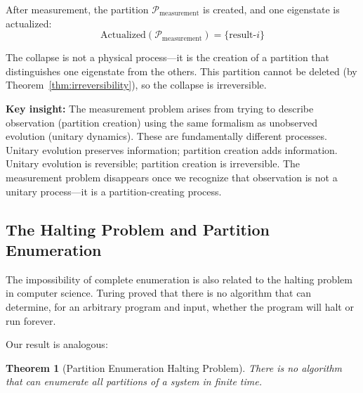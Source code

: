 \documentclass[twocolumn,10pt]{article}
\newtheorem{theorem}{Theorem}[section]
\theoremstyle{definition}
\theoremstyle{remark}
\begin{document}
After measurement, the partition $\mathcal{P}_{\text{measurement}}$ is created, and one eigenstate is actualized:
\begin{equation}
\text{Actualized}(\mathcal{P}_{\text{measurement}}) = \{\text{result-}i\}
\end{equation}

The collapse is not a physical process—it is the creation of a partition that distinguishes one eigenstate from the others. This partition cannot be deleted (by Theorem~\ref{thm:irreversibility}), so the collapse is irreversible.

\vspace{0.2cm}
\noindent\textbf{Key insight:} The measurement problem arises from trying to describe observation (partition creation) using the same formalism as unobserved evolution (unitary dynamics). These are fundamentally different processes. Unitary evolution preserves information; partition creation adds information. Unitary evolution is reversible; partition creation is irreversible. The measurement problem disappears once we recognize that observation is not a unitary process—it is a partition-creating process.

\subsection{The Halting Problem and Partition Enumeration}

The impossibility of complete enumeration is also related to the halting problem in computer science\cite{turing1936}. Turing proved that there is no algorithm that can determine, for an arbitrary program and input, whether the program will halt or run forever.

\vspace{0.2cm}
\noindent Our result is analogous:

\begin{theorem}[Partition Enumeration Halting Problem]
\label{thm:enumeration_halting}
There is no algorithm that can enumerate all partitions of a system in finite time.
\end{theorem}
\end{document}
